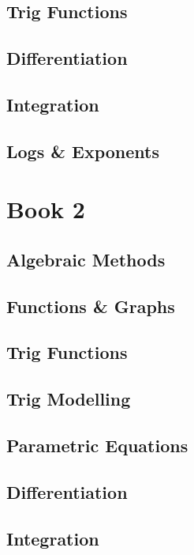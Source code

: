\documentclass{report}
\begin{document}
\chapter{Trig Functions}


\setcounter{chapter}{11}
\chapter{Differentiation}


\chapter{Integration}


\chapter{Logs \& Exponents}



\part{Book 2}

\setcounter{chapter}{0}
\chapter{Algebraic Methods}


\chapter{Functions \& Graphs}


\setcounter{chapter}{5}
\chapter{Trig Functions}


\chapter{Trig Modelling}


\chapter{Parametric Equations}


\chapter{Differentiation}


\setcounter{chapter}{10}
\chapter{Integration}

\end{document}
